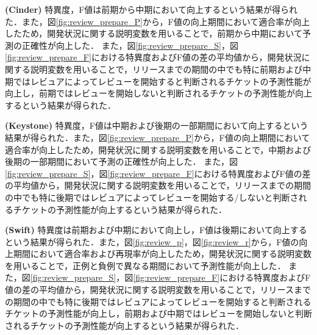 \documentclass[submit]{ipsj}
\begin{document}
\textbf{ (Cinder) }特異度，F値は前期から中期において向上するという結果が得られた．また，図\ref{fig:review_prepare_P}から，F値の向上期間において適合率が向上したため，開発状況に関する説明変数を用いることで，前期から中期において予測の正確性が向上した．
また，図\ref{fig:review_prepare_S}，図\ref{fig:review_prepare_F}における特異度およびF値の差の平均値から，開発状況に関する説明変数を用いることで，リリースまでの期間の中でも特に前期および中期ではレビュアによってレビューを開始すると判断されるチケットの予測性能が向上し，前期ではレビューを開始しないと判断されるチケットの予測性能が向上するという結果が得られた．

\textbf{ (Keystone) }特異度，F値は中期および後期の一部期間において向上するという結果が得られた．また，図\ref{fig:review_prepare_P}から，F値の向上期間において適合率が向上したため，開発状況に関する説明変数を用いることで，中期および後期の一部期間において予測の正確性が向上した．
また，図\ref{fig:review_prepare_S}，図\ref{fig:review_prepare_F}における特異度およびF値の差の平均値から，開発状況に関する説明変数を用いることで，リリースまでの期間の中でも特に後期ではレビュアによってレビューを開始する/しないと判断されるチケットの予測性能が向上するという結果が得られた．

\textbf{ (Swift) }特異度は前期および中期において向上し，F値は後期において向上するという結果が得られた．また，図\ref{fig:review_p}，図\ref{fig:review_r}から，F値の向上期間において適合率および再現率が向上したため，開発状況に関する説明変数を用いることで，正例と負例で異なる期間において予測性能が向上した．
また，図\ref{fig:review_prepare_S}，図\ref{fig:review_prepare_F}における特異度およびF値の差の平均値から，開発状況に関する説明変数を用いることで，リリースまでの期間の中でも特に後期ではレビュアによってレビューを開始すると判断されるチケットの予測性能が向上し，前期および中期ではレビューを開始しないと判断されるチケットの予測性能が向上するという結果が得られた．
\end{document}
